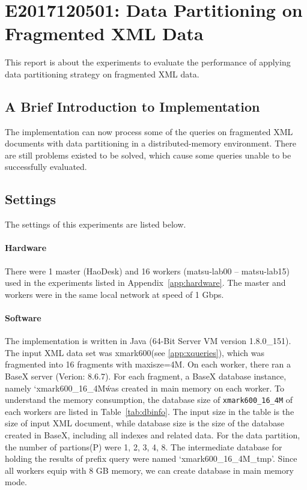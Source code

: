 

\section{E2017120501: Data Partitioning on Fragmented XML Data}

This report is about the experiments to evaluate the performance
of applying data partitioning strategy on fragmented XML data.

\subsection{A Brief Introduction to Implementation}

The implementation can now process some of the queries on fragmented
XML documents with data partitioning in a distributed-memory environment.
There are still problems existed to be solved, which cause some 
queries unable to be successfully evaluated.

\subsection{Settings}

The settings of this experiments are listed below.

\paragraph{Hardware}

There were 1 master (HaoDesk) and 16 workers (matsu-lab00 -- matsu-lab15)
used in the experiments listed in Appendix~\ref{app:hardware}.
The master and workers were in the same local network at speed of 1 Gbps.
 


\paragraph{Software}
The implementation is written in Java (64-Bit Server VM version 1.8.0\_151).
The input XML data set was xmark600(see \ref{app:xqueries}), which was
fragmented into 16 fragments with maxisze=4M.
On each worker, there ran a BaseX server (Verion: 8.6.7).
For each fragment, a BaseX database instance, namely `xmark600\_16\_4M\'
was created in main memory on each worker. To understand the memory
consumption, the database size of \texttt{xmark600\_16\_4M} of each workers
are listed in Table~\ref{tab:dbinfo}. The input size in the table
is the size of input XML document, while database size is the size
of the database created in BaseX, including all indexes and related data.
For the data partition, the number of partions(P) were  1, 2, 3, 4, 8.
The intermediate database for holding the results of prefix
query were named  `xmark600\_16\_4M\_tmp'. Since all workers equip with
8 GB memory, we can create database in main memory mode.


